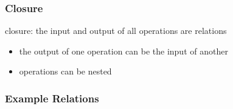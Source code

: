 \documentclass[dvipsnames]{beamer}
\theoremstyle{plain}
\begin{document}
\begin{frame}
  \frametitle{Closure}

  \begin{definition}
    \alert{closure}: the input and output of all operations are relations
  \end{definition}

  \pause
  \begin{itemize}
    \item the output of one operation can be the input of another
    \item operations can be nested
  \end{itemize}
\end{frame}

\begin{frame}
  \frametitle{Example Relations}


\end{frame}
\end{document}
